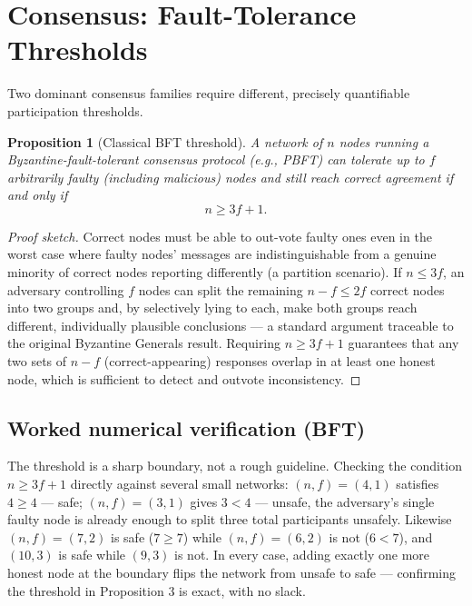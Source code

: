 \documentclass[10pt,journal,compsoc]{IEEEtran}
\newtheorem{proposition}{Proposition}
\begin{document}
\section{Consensus: Fault-Tolerance Thresholds}
Two dominant consensus families require different, precisely quantifiable participation thresholds.

\begin{proposition}[Classical BFT threshold]
A network of $n$ nodes running a Byzantine-fault-tolerant consensus protocol (e.g., PBFT) can tolerate up to $f$ arbitrarily faulty (including malicious) nodes and still reach correct agreement if and only if
\begin{equation}
    n \ge 3f+1.
\end{equation}
\end{proposition}
\begin{proof}[Proof sketch]
Correct nodes must be able to out-vote faulty ones even in the worst case where faulty nodes' messages are indistinguishable from a genuine minority of correct nodes reporting differently (a partition scenario). If $n \le 3f$, an adversary controlling $f$ nodes can split the remaining $n-f \le 2f$ correct nodes into two groups and, by selectively lying to each, make both groups reach different, individually plausible conclusions — a standard argument traceable to the original Byzantine Generals result. Requiring $n \ge 3f+1$ guarantees that any two sets of $n-f$ (correct-appearing) responses overlap in at least one honest node, which is sufficient to detect and outvote inconsistency.
\end{proof}

\subsection{Worked numerical verification (BFT)}
The threshold is a sharp boundary, not a rough guideline. Checking the condition $n\ge 3f+1$ directly against several small networks: $(n,f)=(4,1)$ satisfies $4\ge 4$ — safe; $(n,f)=(3,1)$ gives $3 < 4$ — unsafe, the adversary's single faulty node is already enough to split three total participants unsafely. Likewise $(n,f)=(7,2)$ is safe ($7\ge7$) while $(n,f)=(6,2)$ is not ($6<7$), and $(10,3)$ is safe while $(9,3)$ is not. In every case, adding exactly one more honest node at the boundary flips the network from unsafe to safe — confirming the threshold in Proposition 3 is exact, with no slack.
\end{document}
